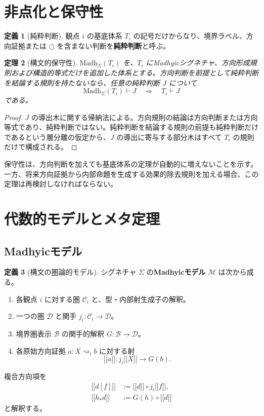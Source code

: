 \documentclass[a4paper,11pt]{ltjsarticle}
\theoremstyle{definition}
\newtheorem{definition}{定義}[section]
\theoremstyle{plain}
\newtheorem{theorem}[definition]{定理}
\newcommand{\Madh}{\mathrm{Madh}}
\newcommand{\Bdy}{\mathcal B}
\newcommand{\dfix}{\bigcirc}
\newcommand{\sem}[1]{\mathopen{[\![}#1\mathclose{]\!]}}
\begin{document}
\section{非点化と保守性}

\begin{definition}[純粋判断]
観点 $i$ の基底体系 $T_i$ の記号だけからなり、境界ラベル、方向証拠または $\dfix$ を含まない判断を\textbf{純粋判断}と呼ぶ。
\end{definition}

\begin{theorem}[構文的保守性]
\label{thm:syntactic-conservativity}
$\Madh_\Sigma(T_i)$ を、$T_i$ にMadhyicシグネチャ、方向形成規則および構造的等式だけを追加した体系とする。方向判断を前提として純粋判断を結論する規則を持たないなら、任意の純粋判断 $J$ について
\[
 \Madh_\Sigma(T_i)\vdash J
 \quad\Longrightarrow\quad
 T_i\vdash J
\]
である。
\end{theorem}

\begin{proof}
$J$ の導出木に関する帰納法による。方向規則の結論は方向判断または方向等式であり、純粋判断ではない。純粋判断を結論する規則の前提も純粋判断だけであるという層分離の仮定から、$J$ の導出に寄与する部分木はすべて $T_i$ の規則だけで構成される。
\end{proof}

保守性は、方向判断を加えても基底体系の定理が自動的に増えないことを示す。一方、将来方向証拠から内部命題を生成する効果的除去規則を加える場合、この定理は再検討しなければならない。

\section{代数的モデルとメタ定理}

\subsection{Madhyicモデル}

\begin{definition}[構文の圏論的モデル]
シグネチャ $\Sigma$ の\textbf{Madhyicモデル} $\mathcal M$ は次から成る。
\begin{enumerate}
 \item 各観点 $i$ に対する圏 $\mathcal C_i$ と、型・内部射生成子の解釈。
 \item 一つの圏 $\mathcal D$ と関手 $j_i:\mathcal C_i\to\mathcal D$。
 \item 境界圏表示 $\Bdy$ の関手的解釈 $G:\Bdy\to\mathcal D$。
 \item 各原始方向証拠 $a:X\rightsquigarrow_i b$ に対する射
 \[
  \sem a:j_i\sem X\longrightarrow G(b).
 \]
\end{enumerate}
複合方向項を
\begin{align*}
 \sem{d[f]}&:=\sem d\circ j_i\sem f,\\
 \sem{h_*d}&:=G(h)\circ\sem d
\end{align*}
と解釈する。
\end{definition}
\end{document}
